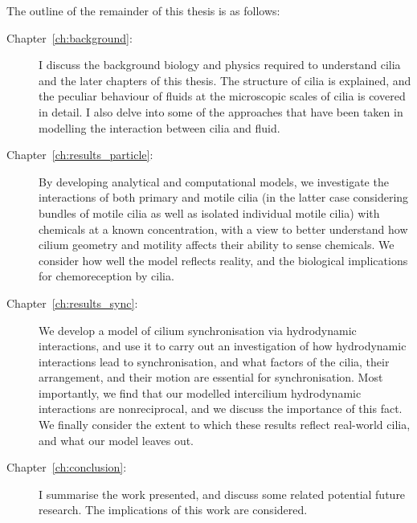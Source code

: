 The outline of the remainder of this thesis is as follows:
\begin{description}
    \item[Chapter~\ref{ch:background}:~] \phantom{X}
    
    I discuss the background biology and physics required to understand cilia and the later chapters of this thesis. The structure of cilia is explained, and the peculiar behaviour of fluids at the microscopic scales of cilia is covered in detail. I also delve into some of the approaches that have been taken in modelling the interaction between cilia and fluid.

    \item[Chapter~\ref{ch:results_particle}:~] \phantom{X}
    
    By developing analytical and computational models, we investigate the interactions of both primary and motile cilia (in the latter case considering bundles of motile cilia as well as isolated individual motile cilia) with chemicals at a known concentration, with a view to better understand how cilium geometry and motility affects their ability to sense chemicals. We consider how well the model reflects reality, and the biological implications for chemoreception by cilia.
    
    \item[Chapter~\ref{ch:results_sync}:~] \phantom{X}
    
    We develop a model of cilium synchronisation via hydrodynamic interactions, and use it to carry out an investigation of how hydrodynamic interactions lead to synchronisation, and what factors of the cilia, their arrangement, and their motion are essential for synchronisation. Most importantly, we find that our modelled intercilium hydrodynamic interactions are nonreciprocal, and we discuss the importance of this fact. We finally consider the extent to which these results reflect real-world cilia, and what our model leaves out.
    
    \item[Chapter~\ref{ch:conclusion}:~] \phantom{X}
    
    I summarise the work presented, and discuss some related potential future research. The implications of this work are considered.
    
\end{description}